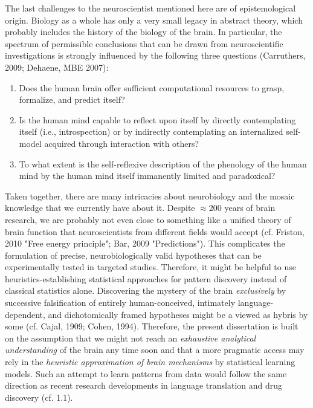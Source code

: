 \documentclass[authoryear,review,3p]{elsarticle}
\begin{document}
The last challenges to the neuroscientist
mentioned here are of epistemological origin.
Biology as a whole has only a very small legacy in abstract theory,
which probably includes the history of the biology of the brain.
In particular,
the spectrum of permissible conclusions
that can be drawn from neuroscientific investigations is strongly influenced
by the following three questions
(Carruthers, 2009; Dehaene, MBE 2007):
\begin{enumerate}
  \item Does the human brain offer sufficient computational resources
  to grasp, formalize, and predict itself?
  \item Is the human mind capable to reflect upon itself
by directly contemplating itself (i.e., introspection) or by
indirectly contemplating an internalized self-model acquired through
interaction with others?
  \item To what extent is the self-reflexive description of the phenology of
  the human mind by the human mind itself immanently
  limited and paradoxical?
\end{enumerate}


Taken together,
there are many intricacies about neurobiology and 
the mosaic knowledge that we currently have about it.
%
Despite $\approx$200 years of brain research,
we are probably not even close to something like a unified theory of
brain function
that neuroscientists from different fields would accept
(cf. Friston, 2010 "Free energy principle"; Bar, 2009 "Predictions").
This complicates the formulation of precise, neurobiologically
valid hypotheses that can be experimentally tested in targeted studies.
%
Therefore, it might be helpful to use heuristics-establishing
statistical approaches for pattern discovery instead of
classical statistics alone.
%
Discovering the mystery of the brain \textit{exclusively} by
successive falsification of
entirely human-conceived,
intimately language-dependent,
and dichotomically framed hypotheses
might be a viewed as hybris by some
(cf. Cajal, 1909; Cohen, 1994).
%
Therefore,
the present dissertation is built on the assumption that
we might not reach an \textit{exhaustive analytical understanding}
of the brain any time soon
and that a more pragmatic access
may rely in the \textit{heuristic
approximation of brain mechanisms} by statistical learning models.
%
Such an attempt to learn patterns from data
would follow the same
direction as recent research developments in
language translation and drug discovery (cf. 1.1).
\end{document}
